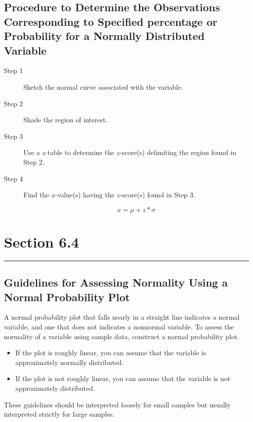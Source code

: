\documentclass[12pt]{article}
\begin{document}
        \subsection*{Procedure to Determine the Observations Corresponding to Specified
        percentage or Probability for a Normally Distributed Variable}
            \begin{description}
                \item[Step 1] Sketch the normal curve associated with the variable.
                \item[Step 2] Shade the region of interest.
                \item[Step 3] Use a $z$-table to determine the $z$-score(s) delimiting the region
                found in Step 2.
                \item[Step 4] Find the $x$-value(s) having the $z$-score(s) found in Step 3.
                \begin{center}
                    \[
                        x = \mu + z * \sigma
                    \]
                \end{center}
            \end{description}
        
    \section*{Section 6.4}
    \noindent\rule{\textwidth}{0.4pt}
        \subsection*{Guidelines for Assessing Normality Using a Normal Probability Plot}
            A normal probability plot that falls nearly in a straight line indicates a normal
            variable, and one that does not indicates a nonnormal variable. To assess the
            normality of a variable using sample data, construct a normal probability plot.
            \begin{itemize}
                \item If the plot is roughly linear, you can assume that the variable is
                approximately normally distributed.
                \item If the plot is not roughly linear, you can assume that the variable is not
                approximately distributed.
            \end{itemize}
            These guidelines should be interpreted loosely for small samples but usually
            interpreted strictly for large samples.
\end{document}
